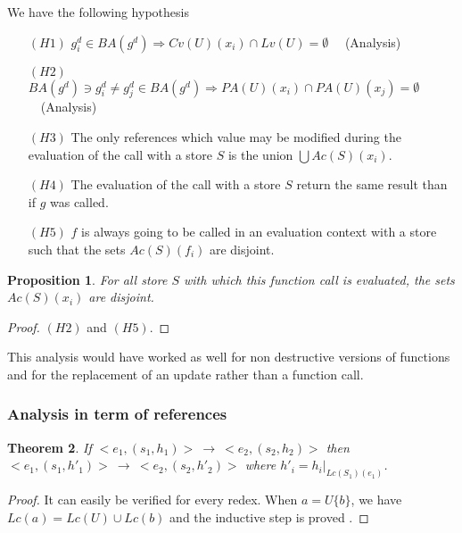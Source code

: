 \documentclass[12pt,a4paper]{article}
\newtheorem{theorem}{Theorem}
\newtheorem{proposition}[theorem]{Proposition}
\newcommand{\ucont}[1]{\{#1\}}
\begin{document}
We have the following hypothesis
\begin{itemize}
\item[$(H1)$] $ g^d_i \in BA(g^d) \Longrightarrow Cv(U)(x_i) \cap Lv(U) = \emptyset $ \ \ (Analysis)
\item[$(H2)$] $BA(g^d) \ni g^d_i \neq g^d_j \in BA(g^d) \Longrightarrow PA(U)(x_i) \cap PA(U)(x_j) = \emptyset$ \ \ (Analysis)
\item[$(H3)$] The only references which value may be modified during the evaluation of the call with a store $S$ is the union $\bigcup Ac(S)(x_i)$.
\item[$(H4)$] The evaluation of the call with a store $S$ return the same result than if $g$ was called.
\item[$(H5)$] $f$ is always going to be called in an evaluation context with a store such that the sets $Ac(S)(f_i)$ are disjoint.
\end{itemize}
\begin{proposition}
For all store $S$ with which this function call is evaluated, the sets $Ac(S)(x_i)$ are disjoint.
\end{proposition}
\begin{proof}
$(H2)$ and $(H5)$.
\end{proof}





This analysis would have worked as well for non destructive versions of functions and for the replacement of an update rather than a function call.

\subsubsection{Analysis in term of references}



\begin{theorem}
If $<e_1, (s_1, h_1)> \ \longrightarrow \ <e_2, (s_2, h_2)>$ then $<e_1, (s_1, h'_1)> \ \longrightarrow \ <e_2, (s_2, h'_2)>$ where $h'_i = h_i|_{Lc(S_1)(e_1)}$.
\end{theorem}
\begin{proof}
It can easily be verified for every redex. When $a = U\ucont{b}$, we have $Lc(a) = Lc(U) \cup Lc(b)$ and the inductive step is proved .
\end{proof}
\end{document}
